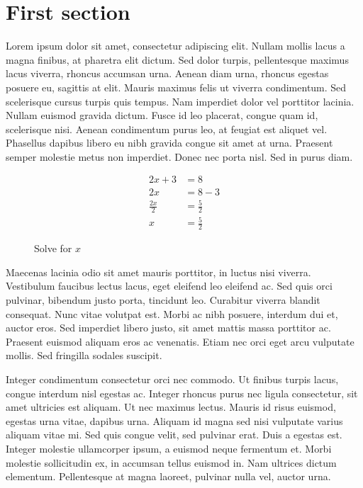\section{First section}

Lorem ipsum dolor sit amet, consectetur adipiscing elit. Nullam mollis lacus a magna finibus, at pharetra elit dictum. Sed dolor turpis, pellentesque maximus lacus viverra, rhoncus accumsan urna. Aenean diam urna, rhoncus egestas posuere eu, sagittis at elit. Mauris maximus felis ut viverra condimentum. Sed scelerisque cursus turpis quis tempus. Nam imperdiet dolor vel porttitor lacinia. Nullam euismod gravida dictum. Fusce id leo placerat, congue quam id, scelerisque nisi. Aenean condimentum purus leo, at feugiat est aliquet vel. Phasellus dapibus libero eu nibh gravida congue sit amet at urna. Praesent semper molestie metus non imperdiet. Donec nec porta nisl. Sed in purus diam.

\begin{figure}[H]
    \begin{align*}
        2x + 3       &= 8 \\
        2x           &= 8 - 3 \\
        \frac{2x}{2} &= \frac{5}{2} \\
        x            &= \frac{5}{2}
    \end{align*}
    \caption{Solve for $x$}
\end{figure}

Maecenas lacinia odio sit amet mauris porttitor, in luctus nisi viverra. Vestibulum faucibus lectus lacus, eget eleifend leo eleifend ac. Sed quis orci pulvinar, bibendum justo porta, tincidunt leo. Curabitur viverra blandit consequat. Nunc vitae volutpat est. Morbi ac nibh posuere, interdum dui et, auctor eros. Sed imperdiet libero justo, sit amet mattis massa porttitor ac. Praesent euismod aliquam eros ac venenatis. Etiam nec orci eget arcu vulputate mollis. Sed fringilla sodales suscipit.

Integer condimentum consectetur orci nec commodo. Ut finibus turpis lacus, congue interdum nisl egestas ac. Integer rhoncus purus nec ligula consectetur, sit amet ultricies est aliquam. Ut nec maximus lectus. Mauris id risus euismod, egestas urna vitae, dapibus urna. Aliquam id magna sed nisi vulputate varius aliquam vitae mi. Sed quis congue velit, sed pulvinar erat. Duis a egestas est. Integer molestie ullamcorper ipsum, a euismod neque fermentum et. Morbi molestie sollicitudin ex, in accumsan tellus euismod in. Nam ultrices dictum elementum. Pellentesque at magna laoreet, pulvinar nulla vel, auctor urna.

